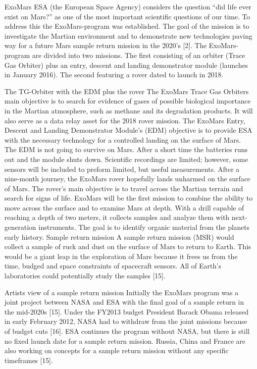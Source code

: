 ExoMars
ESA (the European Space Agency) considers the question “did life ever exist on Mars?” as one of the most important scientific questions of our time. To address this the ExoMars-program was established. The goal of the mission is to investigate the Martian environment and to demonstrate new technologies paving way for a future Mars sample return mission in the 2020’s [2]. 
The ExoMars-program are divided into two missions. The first consisting of an orbiter (Trace Gas Orbiter) plus an entry, descent and landing demonstrator module (launches in January 2016). The second featuring a rover dated to launch in 2018.
 
The TG-Orbiter with the EDM plus the rover
The ExoMars Trace Gas Orbiters main objective is to search for evidence of gases of possible biological importance in the Martian atmosphere, such as methane and its degradation products. It will also serve as a data relay asset for the 2018 rover mission.
The ExoMars Entry, Descent and Landing Demonstrator Module’s (EDM) objective is to provide ESA with the necessary technology for a controlled landing on the surface of Mars. The EDM is not going to survive on Mars. After a short time the batteries runs out and the module shuts down. Scientific recordings are limited; however, some sensors will be included to preform limited, but useful measurements.
After a nine-month journey, the ExoMars rover hopefully lands unharmed on the surface of Mars. The rover’s main objective is to travel across the Martian terrain and search for signs of life. ExoMars will be the first mission to combine the ability to move across the surface and to examine Mars at depth. With a drill capable of reaching a depth of two meters, it collects samples and analyze them with next-generation instruments. The goal is to identify organic material from the planets early history.
Sample return mission
A sample return mission (MSR) would collect a sample of ruck and dust on the surface of Mars to return to Earth. This would be a giant leap in the exploration of Mars because it frees us from the time, budged and space constraints of spacecraft sensors. All of Earth’s laboratories could potentially study the samples [15].
 
Artists view of a sample return mission
Initially the ExoMars program was a joint project between NASA and ESA with the final goal of a sample return in the mid-2020s [15]. Under the FY2013 budget President Barack Obama released in early February 2012, NASA had to withdraw from the joint missions because of budget cuts [16]. ESA continues the program without NASA, but there is still no fixed launch date for a sample return mission.
Russia, China and France are also working on concepts for a sample return mission without any specific timeframes [15].

